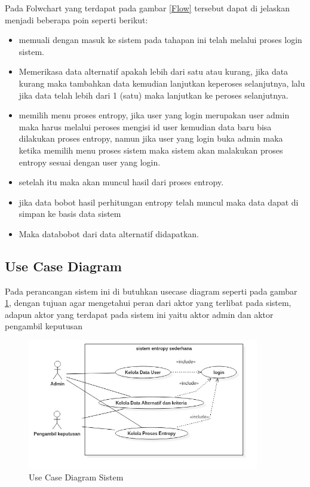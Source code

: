 Pada Folwchart yang terdapat pada gambar \ref{Flow} tersebut dapat di jelaskan menjadi beberapa poin seperti berikut:

\begin{itemize}
\item memuali dengan masuk ke sistem pada tahapan ini telah melalui proses login sistem.
\item Memerikasa data alternatif apakah lebih dari satu atau kurang, jika data kurang maka tambahkan data kemudian lanjutkan keperoses selanjutnya, lalu jika data telah lebih dari 1 (satu) maka lanjutkan ke peroses selanjutnya.
\item memilih menu proses entropy, jika user yang login merupakan user admin maka harus melalui peroses mengisi id user kemudian data baru bisa dilakukan proses entropy, namun jika user yang login buka admin maka ketika memilih menu proses sistem maka sistem akan malakukan proses entropy sesuai dengan user yang login. 
\item setelah itu maka akan muncul hasil dari proses entropy.
\item jika data bobot hasil perhitungan entropy telah muncul maka data dapat di simpan ke basis data sistem
\item Maka databobot dari data alternatif didapatkan.
\end{itemize}
\subsection{Use Case Diagram}
	Pada perancangan sistem ini di butuhkan usecase diagram seperti pada gambar \ref{uml1}, dengan tujuan agar mengetahui peran dari aktor yang terlibat pada sistem, adapun aktor yang terdapat pada sistem ini yaitu aktor admin dan aktor pengambil keputusan

\begin{figure}[!htbp]
	\centerline{\includegraphics[width=0.90\textwidth]{figures/uml/usecasebuku.jpg}}
	\caption{Use Case Diagram Sistem}
	\label{uml1}
\end{figure}

